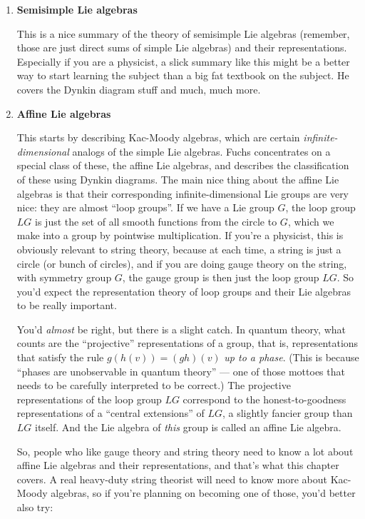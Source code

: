 \documentclass{article}
\begin{document}
\begin{enumerate}
\def\labelenumi{\arabic{enumi}.}
\item
  \textbf{Semisimple Lie algebras}

  This is a nice summary of the theory of semisimple Lie algebras
  (remember, those are just direct sums of simple Lie algebras) and
  their representations. Especially if you are a physicist, a slick
  summary like this might be a better way to start learning the subject
  than a big fat textbook on the subject. He covers the Dynkin diagram
  stuff and much, much more.
\item
  \textbf{Affine Lie algebras}

  This starts by describing Kac-Moody algebras, which are certain
  \emph{infinite-dimensional} analogs of the simple Lie algebras. Fuchs
  concentrates on a special class of these, the affine Lie algebras, and
  describes the classification of these using Dynkin diagrams. The main
  nice thing about the affine Lie algebras is that their corresponding
  infinite-dimensional Lie groups are very nice: they are almost ``loop
  groups''. If we have a Lie group \(G\), the loop group \(LG\) is just
  the set of all smooth functions from the circle to \(G\), which we
  make into a group by pointwise multiplication. If you're a physicist,
  this is obviously relevant to string theory, because at each time, a
  string is just a circle (or bunch of circles), and if you are doing
  gauge theory on the string, with symmetry group \(G\), the gauge group
  is then just the loop group \(LG\). So you'd expect the representation
  theory of loop groups and their Lie algebras to be really important.

  You'd \emph{almost} be right, but there is a slight catch. In quantum
  theory, what counts are the ``projective'' representations of a group,
  that is, representations that satisfy the rule \(g(h(v)) = (gh)(v)\)
  \emph{up to a phase}. (This is because ``phases are unobservable in
  quantum theory'' --- one of those mottoes that needs to be carefully
  interpreted to be correct.) The projective representations of the loop
  group \(LG\) correspond to the honest-to-goodness representations of a
  ``central extensions'' of \(LG\), a slightly fancier group than \(LG\)
  itself. And the Lie algebra of \emph{this} group is called an affine
  Lie algebra.

  So, people who like gauge theory and string theory need to know a lot
  about affine Lie algebras and their representations, and that's what
  this chapter covers. A real heavy-duty string theorist will need to
  know more about Kac-Moody algebras, so if you're planning on becoming
  one of those, you'd better also try:


\end{enumerate}
\end{document}
